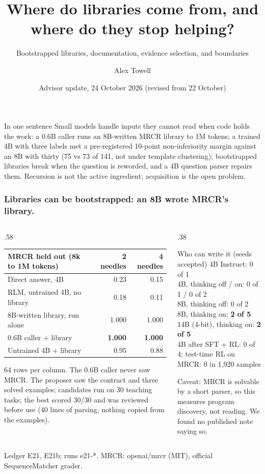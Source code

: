 \documentclass[aspectratio=169,11pt]{beamer}
\title{Where do libraries come from, and where do they stop helping?}
\subtitle{Bootstrapped libraries, documentation, evidence selection, and boundaries}
\author{Alex Towell}
\date{Advisor update, 24 October 2026 (revised from 22 October)}
\newcommand{\source}[1]{\vfill{\scriptsize\color{Gray}#1\par}}
\begin{document}
\begin{frame}[plain]
\titlepage
\vfill
\begin{block}{In one sentence}
Small models handle inputs they cannot read when code holds the work: a 0.6B caller runs an 8B-written MRCR library
to 1M tokens; a trained 4B with three labels met a pre-registered 10-point non-inferiority margin against an 8B with
thirty (75 vs 73 of 141, not under template clustering); bootstrapped libraries break when the question is reworded,
and a 4B question parser repairs them. Recursion is not the active ingredient; acquisition is the open problem.
\end{block}
\end{frame}

\begin{frame}[t]
\frametitle{Libraries can be bootstrapped: an 8B wrote MRCR's library.}
\begin{columns}[T,onlytextwidth]
\begin{column}{.58\textwidth}
\footnotesize
\begin{tabular}{@{}lrr@{}}
\toprule
MRCR held out (8k to 1M tokens) & 2 needles & 4 needles \\
\midrule
Direct answer, 4B & 0.23 & 0.15 \\
RLM, untrained 4B, no library & 0.18 & 0.11 \\
8B-written library, run alone & 1.000 & 1.000 \\
0.6B caller + library & \textbf{1.000} & \textbf{1.000} \\
Untrained 4B + library & 0.95 & 0.88 \\
\bottomrule
\end{tabular}
\medskip

\small 64 rows per column. The 0.6B caller never saw MRCR. The proposer saw the contract and three solved examples; candidates run on 30 teaching tasks; the best scored
30/30 and was reviewed before use (40 lines of parsing, nothing copied from the examples).
\end{column}
\begin{column}{.38\textwidth}
\begin{block}{Who can write it (seeds accepted)}
\small
4B Instruct: 0 of 1\\
4B, thinking off / on: 0 of 1 / 0 of 2\\
8B, thinking off: 0 of 2\\
8B, thinking on: \textbf{2 of 5}\\
14B (4-bit), thinking on: \textbf{2 of 5}\\
4B after SFT + RL: 0 of 4; test-time RL on MRCR: 0 in 1,920 samples
\end{block}
\small \alert{Caveat:} MRCR is solvable by a short parser, so this measures program discovery, not reading. We
found no published note saying so.
\end{column}
\end{columns}
\source{Ledger E21, E21b; runs e21-*. MRCR: openai/mrcr (MIT), official SequenceMatcher grader.}
\end{frame}
\end{document}
